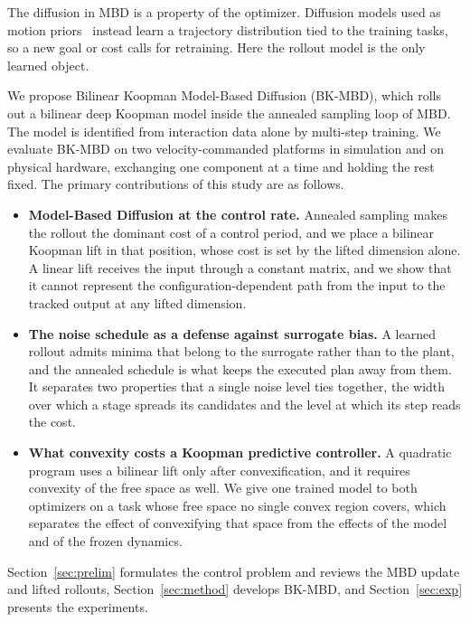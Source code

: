 \documentclass[letterpaper,10pt,conference]{ieeeconf}
\newcommand{\bkmbd}{\textsc{BK-MBD}}
\begin{document}
The diffusion in MBD is a property of the optimizer.
Diffusion models used as motion priors~\cite{janner2022planning, chi2025diffusion, carvalho2023motion} instead learn a trajectory distribution tied to the training tasks, so a new goal or cost calls for retraining.
Here the rollout model is the only learned object.

We propose Bilinear Koopman Model-Based Diffusion (\bkmbd{}), which rolls out a bilinear deep Koopman model inside the annealed sampling loop of MBD.
The model is identified from interaction data alone by multi-step training.
We evaluate \bkmbd{} on two velocity-commanded platforms in simulation and on physical hardware, exchanging one component at a time and holding the rest fixed.
The primary contributions of this study are as follows.

\begin{itemize}
\item \textbf{Model-Based Diffusion at the control rate.}
Annealed sampling makes the rollout the dominant cost of a control period, and we place a bilinear Koopman lift in that position, whose cost is set by the lifted dimension alone.
A linear lift receives the input through a constant matrix, and we show that it cannot represent the configuration-dependent path from the input to the tracked output at any lifted dimension.

\item \textbf{The noise schedule as a defense against surrogate bias.}
A learned rollout admits minima that belong to the surrogate rather than to the plant, and the annealed schedule is what keeps the executed plan away from them.
It separates two properties that a single noise level ties together, the width over which a stage spreads its candidates and the level at which its step reads the cost.

\item \textbf{What convexity costs a Koopman predictive controller.}
A quadratic program uses a bilinear lift only after convexification, and it requires convexity of the free space as well.
We give one trained model to both optimizers on a task whose free space no single convex region covers, which separates the effect of convexifying that space from the effects of the model and of the frozen dynamics.
\end{itemize}

Section~\ref{sec:prelim} formulates the control problem and reviews the MBD update and lifted rollouts, Section~\ref{sec:method} develops \bkmbd{}, and Section~\ref{sec:exp} presents the experiments.
\end{document}
